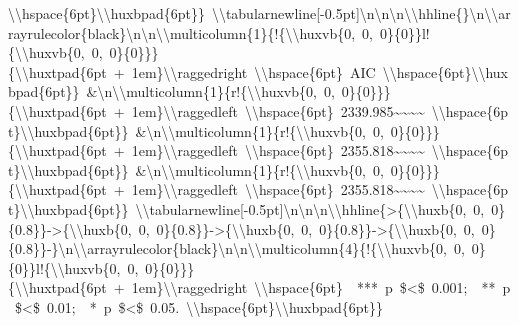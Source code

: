 \documentclass[
  english,
  man]{apa6}
\begin{document}
\textbackslash{}\textbackslash{}hspace\{6pt\}\textbackslash{}\textbackslash{}huxbpad\{6pt\}\}\ \textbackslash{}\textbackslash{}tabularnewline{[}-0.5pt{]}\textbackslash{}n\textbackslash{}n\textbackslash{}n\textbackslash{}\textbackslash{}hhline\{\}\textbackslash{}n\textbackslash{}\textbackslash{}arrayrulecolor\{black\}\textbackslash{}n\textbackslash{}n\textbackslash{}\textbackslash{}multicolumn\{1\}\{!\{\textbackslash{}\textbackslash{}huxvb\{0,\ 0,\ 0\}\{0\}\}l!\{\textbackslash{}\textbackslash{}huxvb\{0,\ 0,\ 0\}\{0\}\}\}\{\textbackslash{}\textbackslash{}huxtpad\{6pt\ +\ 1em\}\textbackslash{}\textbackslash{}raggedright\ \textbackslash{}\textbackslash{}hspace\{6pt\}\ AIC\ \textbackslash{}\textbackslash{}hspace\{6pt\}\textbackslash{}\textbackslash{}huxbpad\{6pt\}\}\ \&\textbackslash{}n\textbackslash{}\textbackslash{}multicolumn\{1\}\{r!\{\textbackslash{}\textbackslash{}huxvb\{0,\ 0,\ 0\}\{0\}\}\}\{\textbackslash{}\textbackslash{}huxtpad\{6pt\ +\ 1em\}\textbackslash{}\textbackslash{}raggedleft\ \textbackslash{}\textbackslash{}hspace\{6pt\}\ 2339.985\textasciitilde{}\textasciitilde{}\textasciitilde{}\textasciitilde{}\ \textbackslash{}\textbackslash{}hspace\{6pt\}\textbackslash{}\textbackslash{}huxbpad\{6pt\}\}\ \&\textbackslash{}n\textbackslash{}\textbackslash{}multicolumn\{1\}\{r!\{\textbackslash{}\textbackslash{}huxvb\{0,\ 0,\ 0\}\{0\}\}\}\{\textbackslash{}\textbackslash{}huxtpad\{6pt\ +\ 1em\}\textbackslash{}\textbackslash{}raggedleft\ \textbackslash{}\textbackslash{}hspace\{6pt\}\ 2355.818\textasciitilde{}\textasciitilde{}\textasciitilde{}\textasciitilde{}\ \textbackslash{}\textbackslash{}hspace\{6pt\}\textbackslash{}\textbackslash{}huxbpad\{6pt\}\}\ \&\textbackslash{}n\textbackslash{}\textbackslash{}multicolumn\{1\}\{r!\{\textbackslash{}\textbackslash{}huxvb\{0,\ 0,\ 0\}\{0\}\}\}\{\textbackslash{}\textbackslash{}huxtpad\{6pt\ +\ 1em\}\textbackslash{}\textbackslash{}raggedleft\ \textbackslash{}\textbackslash{}hspace\{6pt\}\ 2355.818\textasciitilde{}\textasciitilde{}\textasciitilde{}\textasciitilde{}\ \textbackslash{}\textbackslash{}hspace\{6pt\}\textbackslash{}\textbackslash{}huxbpad\{6pt\}\}\ \textbackslash{}\textbackslash{}tabularnewline{[}-0.5pt{]}\textbackslash{}n\textbackslash{}n\textbackslash{}n\textbackslash{}\textbackslash{}hhline\{\textgreater{}\{\textbackslash{}\textbackslash{}huxb\{0,\ 0,\ 0\}\{0.8\}\}-\textgreater{}\{\textbackslash{}\textbackslash{}huxb\{0,\ 0,\ 0\}\{0.8\}\}-\textgreater{}\{\textbackslash{}\textbackslash{}huxb\{0,\ 0,\ 0\}\{0.8\}\}-\textgreater{}\{\textbackslash{}\textbackslash{}huxb\{0,\ 0,\ 0\}\{0.8\}\}-\}\textbackslash{}n\textbackslash{}\textbackslash{}arrayrulecolor\{black\}\textbackslash{}n\textbackslash{}n\textbackslash{}\textbackslash{}multicolumn\{4\}\{!\{\textbackslash{}\textbackslash{}huxvb\{0,\ 0,\ 0\}\{0\}\}l!\{\textbackslash{}\textbackslash{}huxvb\{0,\ 0,\ 0\}\{0\}\}\}\{\textbackslash{}\textbackslash{}huxtpad\{6pt\ +\ 1em\}\textbackslash{}\textbackslash{}raggedright\ \textbackslash{}\textbackslash{}hspace\{6pt\}\ \ ***\ p\ \$\textless{}\$\ 0.001;\ \ **\ p\ \$\textless{}\$\ 0.01;\ \ *\ p\ \$\textless{}\$\ 0.05.\ \textbackslash{}\textbackslash{}hspace\{6pt\}\textbackslash{}\textbackslash{}huxbpad\{6pt\}\}\ 
\end{document}
